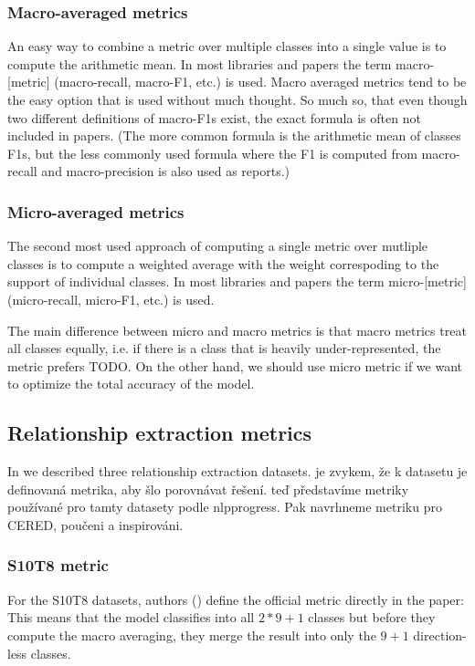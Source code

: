 \subsubsection{Macro-averaged metrics}

An easy way to combine a metric over multiple classes into a single value is to compute the arithmetic mean. In most libraries and papers the term macro-[metric] (macro-recall, macro-F1, etc.) is used.  Macro averaged metrics tend to be the easy option that is used without much thought. So much so, that even though two different definitions of macro-F1s exist, the exact formula is often not included in papers. (The more common formula is the arithmetic mean of classes F1s, but the less commonly used formula where the F1 is computed from macro-recall and macro-precision is also used as  \cite{Opitz2019MacroFA} reports.)

\subsubsection{Micro-averaged metrics}
The second most used approach of computing a single metric over mutliple classes is to compute a weighted average with the weight correspoding to the support of individual classes. In most libraries and papers the term micro-[metric] (micro-recall, micro-F1, etc.) is used. 

The main difference between micro and macro metrics is that macro metrics treat all classes equally, i.e. if there is a class that is heavily under-represented, the metric prefers TODO. On the other hand, we should use micro metric if we want to optimize the total accuracy of the model.

\subsection{Relationship extraction metrics}

In  we described three relationship extraction datasets. je zvykem, že k datasetu je definovaná metrika, aby šlo porovnávat řešení. teď představíme metriky používané pro tamty datasety podle nlpprogress. Pak navrhneme metriku pro CERED, poučeni a inspirováni.

\subsubsection{S10T8 metric}
For the S10T8 datasets, authors (\cite{semeval}) define the official metric directly in the paper:  This means that the model classifies into all $2*9+1$ classes but before they compute the macro averaging, they merge the result into only the $9+1$ direction-less classes.

